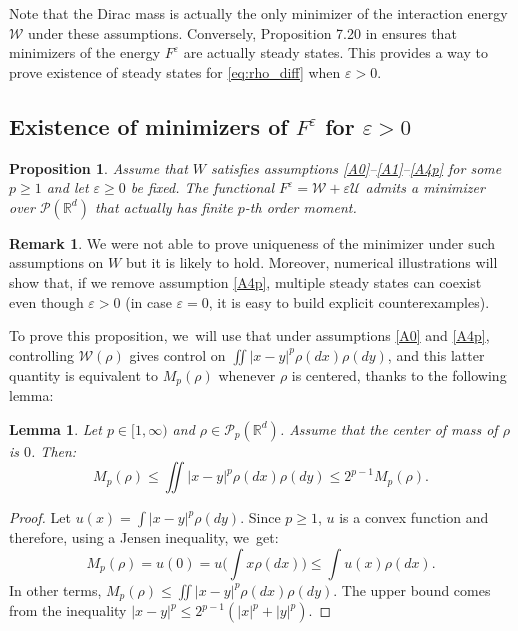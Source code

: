 \documentclass[11pt]{article}
\newcommand{\Subsection}{\subsection}
\numberwithin{equation}{section}
\def\RR{\mathbb{R}}
\def\eps{\varepsilon}
\def\calP{{\mathcal P}}
\def\calU{{\mathcal U}}
\def\calW{{\mathcal W}}
\theoremstyle{plain}
\newtheorem{lemma}[theorem]{Lemma}
\newtheorem{prop}[theorem]{Proposition}
\theoremstyle{definition}
\newtheorem{remark}[theorem]{Remark}
\begin{document}
Note that the Dirac mass is actually the only minimizer of the interaction energy $\calW$ under these assumptions. Conversely, Proposition 7.20 in \cite{otam15} ensures that minimizers of the energy $F^\eps$ are actually steady states. This provides a way to prove existence of steady states for \eqref{eq:rho_diff} when $\eps >0$.

\Subsection{Existence of minimizers of $F^\eps$ for $\eps >0$}

\begin{prop}
Assume that $W$ satisfies assumptions \eqref{A0}--\eqref{A1}--\eqref{A4p} for some $p \geq 1$ and let $\eps \geq 0$ be fixed. The functional $F^\eps = \calW + \eps \calU$ admits a minimizer over $\calP(\RR^d)$ that actually has finite $p$-th order moment.
\end{prop}

\begin{remark}
We were not able to prove uniqueness of the minimizer under such assumptions on $W$ but it is likely to hold. Moreover, numerical illustrations will show that, if we remove assumption \eqref{A4p}, multiple steady states can coexist even though $\eps>0$ (in case $\eps=0$, it is easy to build explicit counterexamples).
\end{remark}
To prove this proposition, we~will use that under assumptions \eqref{A0} and \eqref{A4p}, controlling $\calW(\rho)$ gives control on $\iint |x-y|^p \rho(dx) \rho(dy)$, and this latter quantity is equivalent to $M_p(\rho)$ whenever $\rho$ is centered, thanks to the following lemma:
\begin{lemma}\label{lemma:equivalence_Wp}
Let $p \in [1, \infty)$ and $\rho \in \calP_p(\RR^d)$. Assume that the center of mass of $\rho$ is $0$. Then:
\[
M_p(\rho) \leq \iint |x-y|^p \rho(dx) \rho(dy) \leq 2^{p-1} M_p(\rho).
\]
\end{lemma}

\begin{proof}
Let $u(x) = \int |x-y|^p \rho(dy)$. Since $p \geq 1$, $u$ is a convex function and therefore, using a Jensen inequality, we~get:
\[
M_p(\rho)=u(0) = u \Big(\int x\rho(dx)\Big) \leq \int u(x) \rho(dx).
\]
In other terms, $M_p(\rho) \leq \iint |x-y|^p \rho(dx) \rho(dy)$. The upper bound comes from the inequality $|x-y|^p \leq 2^{p-1} (|x|^p + |y|^p)$.
\end{proof}
\end{document}
